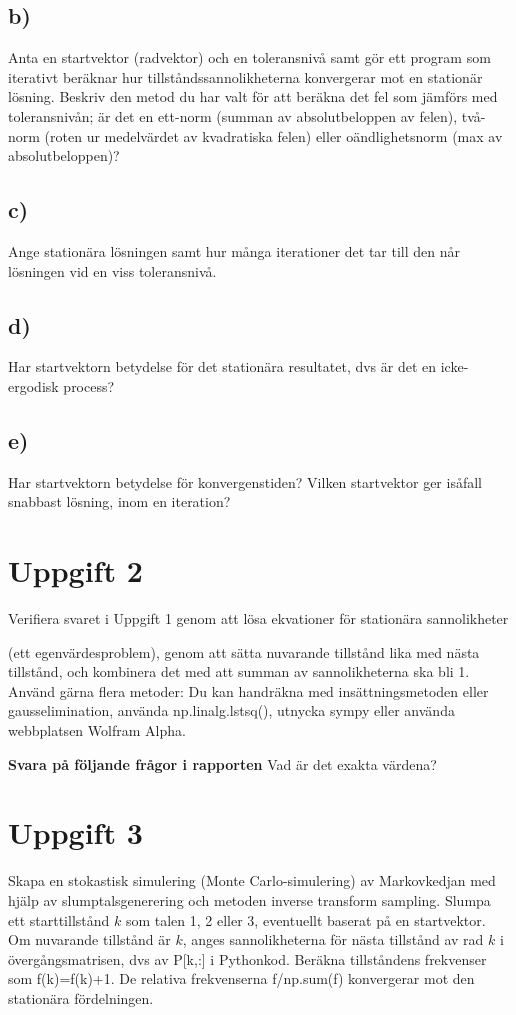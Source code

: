 \documentclass[a4paper]{article}
\begin{document}
\subsection{b)}
Anta en startvektor (radvektor) och en toleransnivå samt gör ett program som iterativt
beräknar hur tillståndssannolikheterna konvergerar mot en stationär lösning. Beskriv den
metod du har valt för att beräkna det fel som jämförs med toleransnivån; är det en ett-norm
(summan av absolutbeloppen av felen), två-norm (roten ur medelvärdet av kvadratiska
felen) eller oändlighetsnorm (max av absolutbeloppen)?

\subsection{c)}
Ange stationära lösningen samt hur många iterationer det tar till den når lösningen vid en
viss toleransnivå.

\subsection{d)}
Har startvektorn betydelse för det stationära resultatet, dvs är det en icke-ergodisk process?

\subsection{e)}
Har startvektorn betydelse för konvergenstiden? Vilken startvektor ger isåfall snabbast
lösning, inom en iteration?

\section{Uppgift 2}
Verifiera svaret i Uppgift 1 genom att lösa ekvationer för stationära sannolikheter

(ett egenvärdesproblem), genom att sätta nuvarande tillstånd lika med nästa tillstånd, och
kombinera det med att summan av sannolikheterna ska bli 1. Använd gärna flera metoder: Du
kan handräkna med insättningsmetoden eller gausselimination,
använda np.linalg.lstsq(), utnycka sympy eller använda
webbplatsen Wolfram Alpha.

\textbf{Svara på följande frågor i rapporten}
Vad är det exakta värdena?


\section{Uppgift 3}
Skapa en stokastisk simulering (Monte Carlo-simulering) av Markovkedjan med hjälp av
slumptalsgenerering och metoden inverse transform sampling. Slumpa ett starttillstånd \( k \) som
talen 1, 2 eller 3, eventuellt baserat på en startvektor. Om nuvarande tillstånd är \( k \), anges
sannolikheterna för nästa tillstånd av rad \( k \) i övergångsmatrisen, dvs av P[k,:] i Pythonkod.
Beräkna tillståndens frekvenser som f(k)=f(k)+1. De relativa frekvenserna f/np.sum(f)
konvergerar mot den stationära fördelningen.
\end{document}
